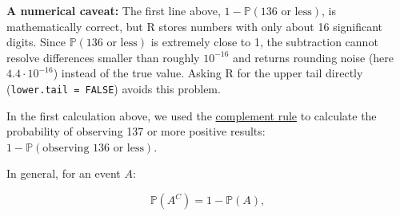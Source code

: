 \documentclass[
]{book}
\begin{document}
\textbf{A numerical caveat:} The first line above, \(1 - \mathbb{P}(\text{136 or less})\), is mathematically correct, but R stores numbers with only about 16
significant digits. Since \(\mathbb{P}(\text{136 or less})\) is extremely close to 1, the subtraction cannot resolve differences
smaller than roughly \(10^{-16}\) and returns rounding noise (here \(4.4 \cdot 10^{-16}\)) instead of the true value.
Asking R for the upper tail directly (\texttt{lower.tail\ =\ FALSE}) avoids this problem.

In the first calculation above, we used the \href{https://en.wikipedia.org/wiki/Complement_(set_theory)}{complement rule} to calculate the probability of
observing 137 or more positive results: \(1 - \mathbb{P}(\text{observing 136 or less})\).

In general, for an event \(A\):

\[\mathbb{P}(A^C) = 1 - \mathbb{P}(A),\]
\end{document}
